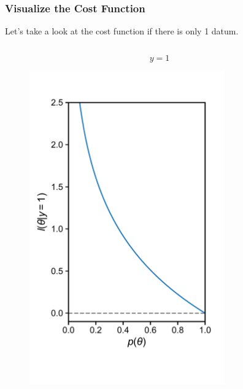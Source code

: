 \documentclass[10pt,aspectratio=169]{beamer}
\begin{document}
      \begin{frame}
        \frametitle{Visualize the Cost Function}
        Let's take a look at the cost function if there is only 1 datum.
        
        \begin{columns}[T]
          \begin{column}{0.5\textwidth}
          \begin{equation*}
          y = 1
        \end{equation*}
                  \vspace{-4em}
            \begin{figure}[t]
              \includegraphics[width=0.75\textwidth]{scripts/loss_1.pdf}
            \end{figure}
          \end{column}


\end{columns}
\end{frame}
\end{document}
